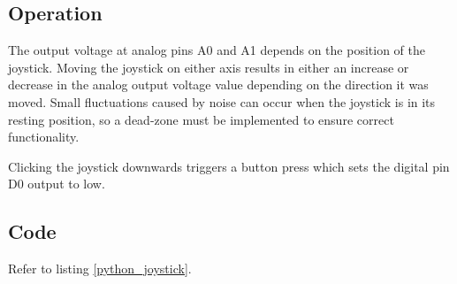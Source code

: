 \subsection*{Operation}
The output voltage at analog pins A0 and A1 depends on the position of the joystick. Moving the joystick on either axis results in either an increase or decrease in the analog output voltage value depending on the direction it was moved. Small fluctuations caused by noise can occur when the joystick is in its resting position, so a dead-zone must be implemented to ensure correct functionality.

Clicking the joystick downwards triggers a button press which sets the digital pin D0 output to low.
\subsection*{Code}
Refer to listing \ref{python_joystick}.
%